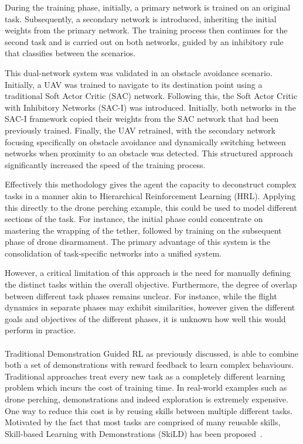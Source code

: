 During the training phase, initially, a primary network is trained on an original task.
Subsequently, a secondary network is introduced, inheriting the initial weights from the primary network.
The training process then continues for the second task and is carried out on both networks, guided by an inhibitory rule that classifies between the scenarios.

This dual-network system was validated in an obstacle avoidance scenario.
Initially, a UAV was trained to navigate to its destination point using a traditional Soft Actor Critic (SAC) network. 
Following this, the Soft Actor Critic with Inhibitory Networks (SAC-I) was introduced. 
Initially, both networks in the SAC-I framework copied their weights from the SAC network that had been previously trained. 
Finally, the UAV retrained, with the secondary network focusing specifically on obstacle avoidance and dynamically switching between networks when proximity to an obstacle was detected. 
This structured approach significantly increased the speed of the training process.


Effectively this methodology gives the agent the capacity to deconstruct complex tasks in a manner akin to Hierarchical Reinforcement Learning (HRL). 
Applying this directly to the drone perching example, this could be used to model different sections of the task.
For instance, the initial phase could concentrate on mastering the wrapping of the tether, followed by training on the subsequent phase of drone disarmament. 
The primary advantage of this system is the consolidation of task-specific networks into a unified system.

However, a critical limitation of this approach is the need for manually defining the distinct tasks within the overall objective. 
Furthermore, the degree of overlap between different task phases remains unclear. 
For instance, while the flight dynamics in separate phases may exhibit similarities, however given the different goals and objectives of the different phases, it is unknown how well this would perform in practice. \\\\


Traditional Demonstration Guided RL as previously discussed, is able to combine both a set of demonstrations with reward feedback to learn complex behaviours.
Traditional approaches treat every new task as a completely different learning problem which incurs the cost of training time.
In real-world examples such as drone perching, demonstrations and indeed exploration is extremely expensive.
One way to reduce this cost is by reusing skills between multiple different tasks.
Motivated by the fact that most tasks are comprised of many reusable skills, Skill-based Learning with Demonstrations (SkiLD) has been proposed~\cite{fyp15-demo-guided-rl-with-skills}.

